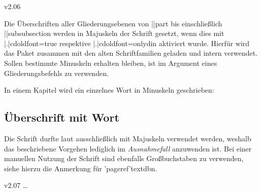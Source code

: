\begin{Entity}{}
\begin{NoIndexDefault}
\begin{Cessations}{v2.06}
\begin{Cessation}
\begin{Cessation}
\begin{Cessation}
\begin{Cessation}
\begin{Cessation}
\begin{Cessation}
\begin{Cessation}
\begin{Cessation}
\begin{Cessation}
\begin{Cessation}
\begin{Cessation}
\begin{Cessation}
\begin{Cessation}
\begin{Cessation}
\begin{Cessation}
\begin{Cessation}
\begin{Cessation}
\begin{Cessation}
\end{Cessation}
\end{Cessation}
\end{Cessation}
\end{Cessation}
\end{Cessation}
\end{Cessation}
\end{Cessation}
\end{Cessation}
\end{Cessation}
\end{Cessation}
\end{Cessation}
\end{Cessation}
\end{Cessation}
\end{Cessation}
\end{Cessation}
\end{Cessation}
\end{Cessation}
\end{Cessation}


%
Die Überschriften aller Gliederungsebenen von \Macro||{part} bis einschließlich 
\Macro||{subsubsection} werden in Majuskeln der Schrift \DIN gesetzt, wenn dies 
mit \Option|.|{cdoldfont=true} respektive \Option|.|{cdoldfont=onlydin} 
aktiviert wurde. Hierfür wird das Paket  zusammen mit den 
alten Schriftfamilien geladen und intern  verwendet. 
Sollen bestimmte Minuskeln erhalten bleiben, ist  im 
Argument eines Gliederungsbefehls zu verwenden.
%
\begin{Example}
In einem Kapitel wird ein einzelnes Wort in Minuskeln geschrieben:
\begin{Code}[escapechar=§]
\chapter{Überschrift mit  Wort}
\end{Code}
\end{Example}
%
Die Schrift \DIN durfte laut \CD ausschließlich mit Majuskeln verwendet werden, 
weshalb das beschriebene Vorgehen lediglich im \emph{Ausnahmefall} anzuwenden 
ist. Bei einer manuellen Nutzung der Schrift sind ebenfalls Großbuchstaben zu 
verwenden, siehe hierzu die Anmerkung für \Macro'pageref'{textdbn}.
\end{Cessations}

\begin{Cessations}{v2.07}
\dots
{}%
\end{Cessations}
\end{NoIndexDefault}
\end{Entity}
